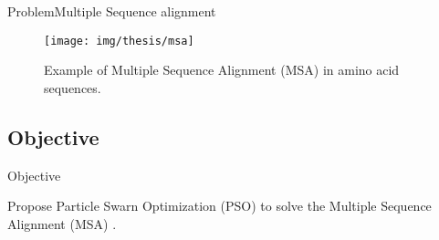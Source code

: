 \documentclass[10pt]{beamer}
\newcommand{\1}{
        	\setbeamertemplate{background}{
        		\texttt{[image: img/1]}
        		\tikz[overlay] \fill[fill opacity=0.75,fill=white] (0,0) rectangle (-\paperwidth,\paperheight);
        	}
}
\begin{document}
\begin{frame}{Problem}{Multiple Sequence alignment}

	\begin{figure}[]
		\centering
		\texttt{[image: img/thesis/msa]}
		\label{img:alig}
		\caption{Example of Multiple Sequence Alignment (MSA) in amino acid sequences.}
	\end{figure}	
	
\end{frame}


\subsection{Objective}

\begin{frame}{Objective}{}
	
\begin{block}{}
	Propose Particle Swarn Optimization (PSO) to solve the Multiple Sequence Alignment (MSA) \cite{zablocki2009multiple}.
\end{block}	
	
\end{frame}


\end{document}
